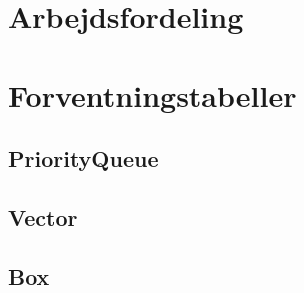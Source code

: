 % 

% 

% 

% 


\section{Arbejdsfordeling}
\label{sec:arbejdsfordeling}


% 

% 

% 

\label{sec:pq}


\section{Forventningstabeller}
\label{sec:forventningstabeller}
\subsection{PriorityQueue}

\clearpage

\clearpage
\subsection{Vector}

\clearpage
\subsection{Box}

\clearpage